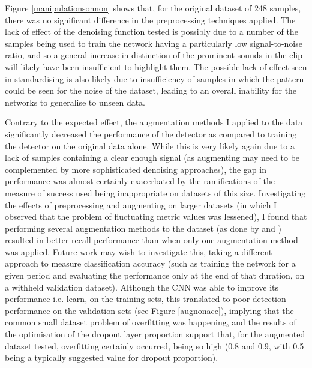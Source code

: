 \documentclass[11pt]{article}
\begin{document}
Figure \ref{manipulationsonnon} shows that, for the original dataset of 248 samples, there was no significant difference in the preprocessing techniques applied. The lack of effect of the denoising function tested is possibly due to a number of the samples being used to train the network having a particularly low signal-to-noise ratio, and so a general increase in distinction of the prominent sounds in the clip will likely have been insufficient to highlight them. The possible lack of effect seen in standardising is also likely due to insufficiency of samples in which the pattern could be seen for the noise of the dataset, leading to an overall inability for the networks to generalise to unseen data.

Contrary to the expected effect, the augmentation methods I applied to the data significantly decreased the performance of the detector as compared to training the detector on the original data alone. While this is very likely again due to a lack of samples containing a clear enough signal (as augmenting may need to be complemented by more sophisticated denoising approaches), the gap in performance was almost certainly exacerbated by the ramifications of the measure of success used being inappropriate on datasets of this size. Investigating the effects of preprocessing and augmenting on larger datasets (in which I observed that the problem of fluctuating metric values was lessened), I found that performing several augmentation methods to the dataset (as done by \cite{kahl2017large} and \cite{salamon2017deep}) resulted in better recall performance than when only one augmentation method was applied. Future work may wish to investigate this, taking a different approach to measure classification accuracy (such as training the network for a given period and evaluating the performance only at the end of that duration, on a withheld validation dataset). Although the CNN was able to improve its performance i.e. learn, on the training sets, this translated to poor detection performance on the validation sets (see Figure \ref{augnonacc}), implying that the common small dataset problem of overfitting was happening, and the results of the optimisation of the dropout layer proportion support that, for the augmented dataset tested, overfitting certainly occurred, being so high (0.8 and 0.9, with 0.5 being a typically suggested value for dropout proportion). 
\end{document}
